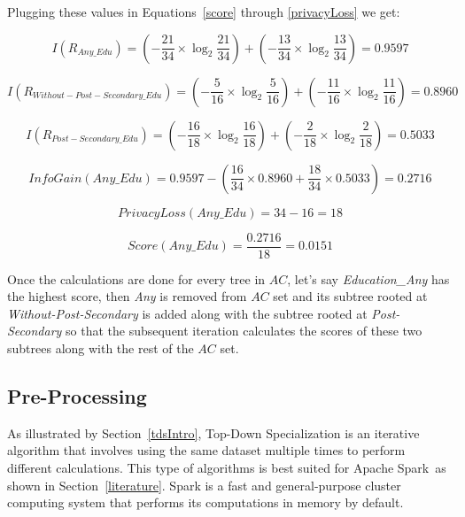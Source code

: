 \documentclass[11pt]{article}       %
\begin{document}
Plugging these values in Equations~\ref{score} through \ref{privacyLoss} we get:

\[ I (R_{Any\_Edu}) = (- \frac{21}{34} \times \log_2 \frac{21}{34}) + (- \frac{13}{34} \times \log_2 \frac{13}{34}) = 0.9597 \]

\[ I (R_{Without-Post-Secondary\_Edu}) = (- \frac{5}{16} \times \log_2 \frac{5}{16}) + (- \frac{11}{16} \times \log_2 \frac{11}{16}) = 0.8960 \]

\[ I (R_{Post-Secondary\_Edu}) = (- \frac{16}{18} \times \log_2 \frac{16}{18}) + (- \frac{2}{18} \times \log_2 \frac{2}{18}) = 0.5033 \]

\[ InfoGain(Any\_Edu) = 0.9597 - (\frac{16}{34} \times 0.8960 + \frac{18}{34} \times 0.5033) = 0.2716 \]

\[ PrivacyLoss(Any\_Edu) = 34 - 16 = 18 \]

\[ Score(Any\_Edu) = \frac{0.2716}{18} = 0.0151 \]

Once the calculations are done for every tree in $AC$, let's say \emph{Education\_Any} has the highest score, then \emph{Any} is removed from $AC$ set and its subtree rooted at \emph{Without-Post-Secondary} is added along with the subtree rooted at \emph{Post-Secondary} so that the subsequent iteration calculates the scores of these two subtrees along with the rest of the $AC$ set.

\subsection{Pre-Processing}

As illustrated by Section~\ref{tdsIntro}, Top-Down Specialization is an iterative algorithm that involves using the same dataset multiple times to perform different calculations. This type of algorithms is best suited for Apache Spark\texttrademark~as shown in Section~\ref{literature}. Spark is a fast and general-purpose cluster computing system that performs its computations in memory by default.
\end{document}
